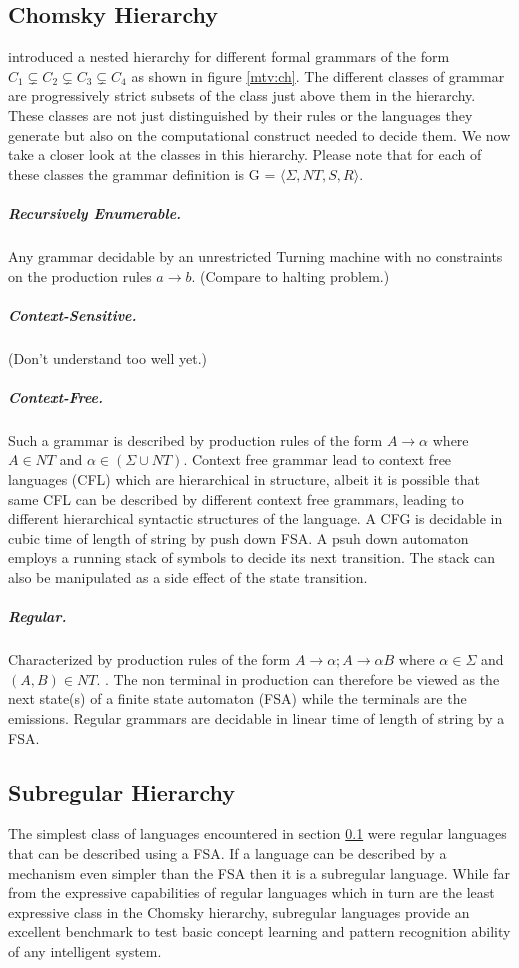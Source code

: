 \subsection{Chomsky Hierarchy}\label{flt:ch}
\cite{Chomsky1956} introduced a nested hierarchy for different formal grammars of the form $C_1 \subsetneq C_2 \subsetneq C_3 \subsetneq C_4$ as shown in figure \ref{mtv:ch}. The different classes of grammar are progressively strict subsets of the class just above them in the hierarchy. These classes are not just distinguished by their rules or the languages they generate but also on the computational construct needed to decide them. We now take a closer look at the classes in this hierarchy. Please note that for each of these classes the grammar definition is G = $\langle \Sigma, NT, S, R \rangle$.
\subparagraph{Recursively Enumerable.} Any grammar decidable by an unrestricted Turning machine with no constraints on the production rules $a \rightarrow b$. (Compare to halting problem.)
\subparagraph{Context-Sensitive.} (Don't understand too well yet.)
\subparagraph{Context-Free.} Such a grammar is described by production rules of the form $A \rightarrow \alpha$ where $A \in NT$ and $\alpha \in (\Sigma \cup NT)$. Context free grammar lead to context free languages (CFL) which are hierarchical in structure, albeit it is possible that same CFL can be described by different context free grammars, leading to different hierarchical syntactic structures of the language. A CFG is decidable in cubic time of length of string by push down FSA. A psuh down automaton employs a running stack of symbols to decide its next transition. The stack can also be manipulated as a side effect of the state transition.
\subparagraph{Regular.} Characterized by production rules of the form $A \rightarrow \alpha ; A \rightarrow \alpha B$ where $\alpha \in \Sigma$ and $(A, B) \in NT$. . The non terminal in production can therefore be viewed as the next state(s) of a finite state automaton (FSA) while the terminals are the emissions. Regular grammars are decidable in linear time of length of string by a FSA.


\subsection{Subregular Hierarchy}\label{flt:sh}
The simplest class of languages encountered in section \ref{flt:ch} were regular languages that can be described using a FSA. If a language can be described by a mechanism even simpler than the FSA then it is a subregular language. While far from the expressive capabilities of regular languages which in turn are the least expressive class in the Chomsky hierarchy, subregular languages provide an excellent benchmark to test basic concept learning and pattern recognition ability of any intelligent system.

